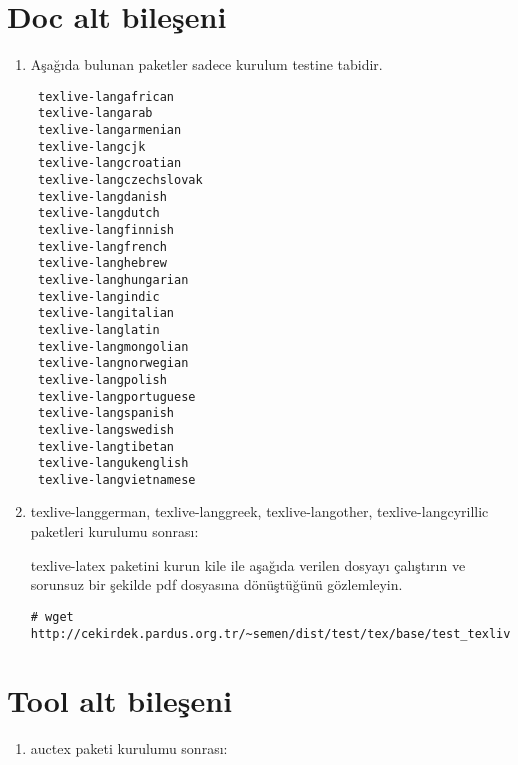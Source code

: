 \documentclass[a4paper,10pt]{article}
\begin{document}
\section{Doc alt bileşeni} 
\begin{enumerate}
 \item Aşağıda bulunan paketler sadece kurulum testine tabidir.
\begin{verbatim}
 texlive-langafrican
 texlive-langarab
 texlive-langarmenian
 texlive-langcjk
 texlive-langcroatian
 texlive-langczechslovak
 texlive-langdanish
 texlive-langdutch
 texlive-langfinnish
 texlive-langfrench
 texlive-langhebrew
 texlive-langhungarian
 texlive-langindic
 texlive-langitalian
 texlive-langlatin
 texlive-langmongolian
 texlive-langnorwegian
 texlive-langpolish
 texlive-langportuguese
 texlive-langspanish
 texlive-langswedish
 texlive-langtibetan
 texlive-langukenglish
 texlive-langvietnamese
\end{verbatim}
\item  texlive-langgerman, texlive-langgreek, texlive-langother, texlive-langcyrillic paketleri kurulumu sonrası:

texlive-latex paketini kurun kile ile aşağıda verilen dosyayı çalıştırın ve sorunsuz bir şekilde pdf dosyasına dönüştüğünü gözlemleyin.

\begin{verbatim}
# wget http://cekirdek.pardus.org.tr/~semen/dist/test/tex/base/test_texlivelatex.tex
\end{verbatim}

\end{enumerate}

\section{Tool alt bileşeni}
\begin{enumerate}
 \item auctex paketi kurulumu sonrası:

\end{enumerate}
\end{document}
